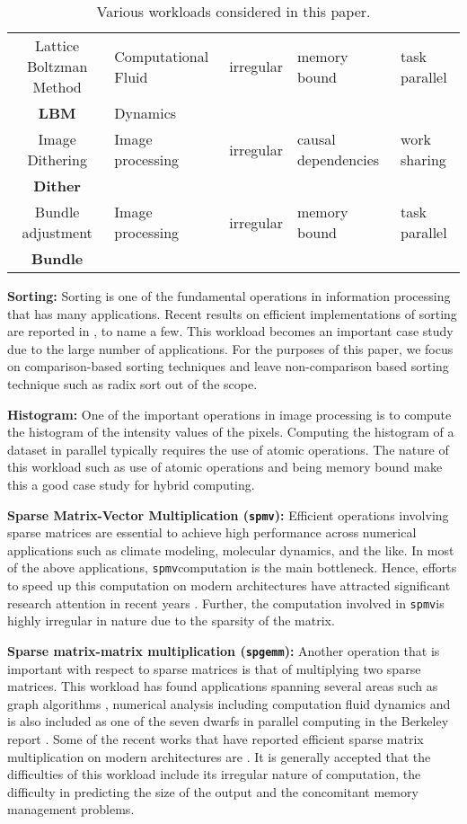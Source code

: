\documentclass[11pt]{article}
\newcommand{\sgemm} {{\tt spgemm}}
\newcommand{\spmv} {{\tt spmv}}
\newcommand{\Bundle} {{\bf Bundle}}
\newcommand{\Dither} {{\bf Dither}}
\newcommand{\LBM} {{\bf LBM}}
\begin{document}
\begin{table*}[htp!]
\begin{center}
\begin{tabular}{|c||l|l|l|l|}
\hline
 Lattice Boltzman Method &  Computational Fluid & irregular
 & memory bound & task parallel \\
\LBM   & Dynamics & & & \\	 
\hline
 Image Dithering  &  Image processing & irregular & causal dependencies &work sharing   \\
\Dither & & & & \\
\hline
 Bundle adjustment  &   Image processing & irregular & memory bound & task parallel\\
\Bundle & & & & \\
\hline
\end{tabular}
\caption{Various workloads considered in this paper.}
\end{center}
\label{table:workloads}
\end{table*}

{\bf Sorting: } Sorting is one of the fundamental operations in information
processing that has many applications. Recent results
on efficient implementations of sorting are reported in
\cite{sanders10,owens11}, to name a few. This workload becomes an important
case study due to the large number of applications. 
For the purposes of
this paper, we focus on comparison-based sorting techniques and leave
non-comparison based sorting technique such as radix sort out of the
scope.

{\bf Histogram: } One of the important operations in image processing is to
compute the histogram of the intensity values of the pixels. Computing the histogram of a
dataset in parallel typically requires the use of atomic operations. The nature of this workload such as use of atomic
operations and being memory bound make this a good case study for hybrid
computing.


{\bf  Sparse Matrix-Vector Multiplication (\spmv): } Efficient operations
involving sparse matrices are essential
to achieve high performance across numerical applications such as climate 
modeling, molecular
dynamics, and the like.
In most of the above applications, \spmv computation is the main
bottleneck. 
Hence, efforts to speed up this computation on modern architectures have attracted
significant research attention in recent years \cite{vuduc07,lanczos}.
Further, the computation involved in \spmv is highly irregular in nature 
due to the sparsity of the matrix. 

{\bf Sparse matrix-matrix multiplication (\sgemm): } Another operation that is
important with respect to sparse matrices is that of multiplying two sparse
matrices. This workload has found applications spanning several areas such
as graph algorithms \cite{kunle11}, numerical analysis including computation
fluid dynamics \cite{cfd1,cfd2,lanczos} and is also included
as one of the seven dwarfs in parallel computing in the Berkeley report
\cite{landscape}. Some of the recent works that have reported efficient
sparse matrix multiplication on modern architectures are \cite{buluc}. It
is generally accepted that the difficulties of this workload include its
irregular nature of computation, the difficulty in predicting the size of
the output and the concomitant memory management problems.
\end{document}
